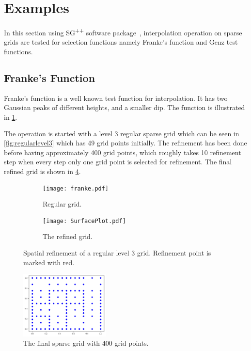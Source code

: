 
\section{Examples}\label{sec:example}

In this section using SG\textsuperscript{++} software package~\cite{pflueger10spatially},
interpolation operation on sparse grids are tested for selection functions namely
Franke's function and Genz test functions.

\subsection{Franke's Function}\label{subsec:frankeexample}

Franke's function is a well known test function for interpolation.
It has two Gaussian peaks of different heights, and a smaller dip.
The function is illustrated in \cref{fig:fullfranke}.

The operation is started with a level 3 regular sparse grid which can be seen
in \cref{fig:regularlevel3} which has 49 grid points initially. The refinement
has been done before having approximately 400 grid points, which roughly
takes 10 refinement step when every step only one grid point is selected
for refinement. The final refined grid is shown in \cref{fig:frankegrid}.

\begin{figure}[hbtp]
    \centering
    \begin{subfigure}{0.45\textwidth}
        \texttt{[image: franke.pdf]}
        \caption{Regular grid.}
        \label{fig:fullfranke}
    \end{subfigure}
    \begin{subfigure}{0.45\textwidth}
        \texttt{[image: SurfacePlot.pdf]}
        \caption{The refined grid.}
        \label{fig:interpolatedfranke}
    \end{subfigure}
    \caption{Spatial refinement of a regular level 3 grid. Refinement point is marked with red.}
    \label{fig:frankesurfaceplots}
\end{figure}

\begin{figure}[hbtp]
    \centering
    \includegraphics[width=0.4\textwidth]{figures/grid_final.pdf}
    \caption{The final sparse grid with 400 grid points.}
    \label{fig:frankegrid}
\end{figure}

